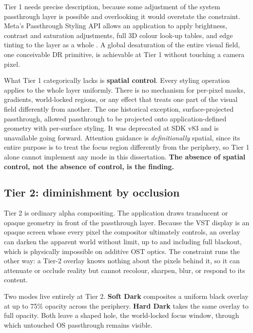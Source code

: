 Tier 1 needs precise description, because some adjustment of the system passthrough layer is
possible and overlooking it would overstate the constraint. Meta's Passthrough
Styling API allows an application to apply brightness, contrast and saturation adjustments, full 3D
colour look-up tables, and edge tinting to the layer as a whole \citep{meta2024a}. A global
desaturation of the entire visual field, one conceivable DR primitive, is achievable at Tier 1
without touching a camera pixel.

What Tier 1 categorically lacks is \textbf{spatial control}. Every styling operation applies to the
whole layer uniformly. There is no mechanism for per-pixel masks, gradients, world-locked regions, or
any effect that treats one part of the visual field differently from another. The one historical
exception, surface-projected passthrough, allowed passthrough to be projected onto
application-defined geometry with per-surface styling. It was deprecated at SDK v83 and is
unavailable going forward. Attention guidance is \textit{definitionally} spatial, since its entire
purpose is to treat the focus region differently from the periphery, so Tier 1 alone cannot implement
any mode in this dissertation. \textbf{The absence of spatial control, not the absence of control, is
the finding.}

\subsection{Tier 2: diminishment by occlusion}

Tier 2 is ordinary alpha compositing. The application draws translucent or opaque geometry in front
of the passthrough layer. Because the VST display is an opaque screen whose every pixel the
compositor ultimately controls, an overlay can darken the apparent world without limit, up to and
including full blackout, which is physically impossible on additive OST optics. The constraint runs
the other way: a Tier-2 overlay knows nothing about the pixels behind it, so it can attenuate or
occlude reality but cannot recolour, sharpen, blur, or respond to its content.

Two modes live entirely at Tier 2. \textbf{Soft Dark} composites a uniform black overlay at up to
75\% opacity across the periphery. \textbf{Hard Dark} takes the same overlay to full opacity. Both
leave a shaped hole, the world-locked focus window, through which untouched OS passthrough remains
visible.

